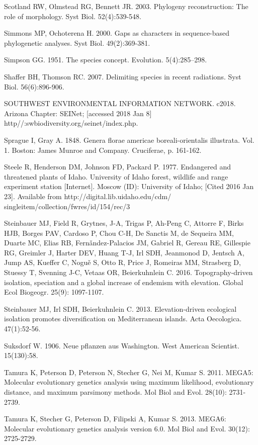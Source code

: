 Scotland RW, Olmstead RG, Bennett JR. 2003. Phylogeny reconstruction: The role of morphology. Syst Biol. 52(4):539-548.

Simmons MP, Ochoterena H. 2000. Gaps as characters in sequence-based phylogenetic analyses. Syst Biol. 49(2):369-381.

Simpson GG. 1951. The species concept. Evolution. 5(4):285–298.

Shaffer BH, Thomson RC. 2007. Delimiting species in recent radiations. Syst Biol. 56(6):896-906.

SOUTHWEST ENVIRONMENTAL INFORMATION NETWORK. c2018. Arizona Chapter: SEINet; [accessed 2018 Jan 8] http//:swbiodiversity.org/seinet/index.php.

Sprague I, Gray A. 1848. Genera florae americae boreali-orientalis illustrata.  Vol. 1. Boston: James Munroe and Company. Cruciferae, p. 161-162.

Steele R, Henderson DM, Johnson FD, Packard P. 1977. Endangered and threatened plants of Idaho. University of Idaho forest, wildlife and range experiment station [Internet]. Moscow (ID): University of Idaho; [Cited 2016 Jan 23]. Available from http://digital.lib.uidaho.edu/cdm/ singleitem/collection/fwres/id/154/rec/3

Steinbauer MJ, Field R, Grytnes, J-A, Trigas P, Ah-Peng C, Attorre F, Birks HJB, Borges PAV, Cardoso P, Chou C-H, De Sanctis M, de Sequeira MM,  Duarte MC, Elias RB, Fern\v{a}ndez-Palacios JM, Gabriel R, Gereau RE, Gillespie RG, Greimler J, Harter DEV, Huang T-J, Irl SDH, Jeanmonod D, Jentsch A, Jump AS, Kueffer C, Nogu\v{e} S, Otto R, Price J, Romeiras MM, Strasberg D, Stuessy T, Svenning J-C, Vetaas OR, Beierkuhnlein C. 2016. Topography-driven isolation, speciation and a global increase of endemism with elevation. Global Ecol Biogeogr. 25(9): 1097-1107.

Steinbauer MJ, Irl SDH, Beierkuhnlein C. 2013. Elevation-driven ecological isolation promotes diversification on Mediterranean islands. Acta Oecologica. 47(1):52-56.

Suksdorf W. 1906. Neue pflanzen aus Washington. West American Scientist. 15(130):58.

Tamura K, Peterson D, Peterson N, Stecher G, Nei M, Kumar S. 2011. MEGA5: Molecular evolutionary genetics analysis using maximum likelihood, evolutionary distance, and maximum parsimony methods. Mol Biol and Evol. 28(10): 2731-2739.

Tamura K, Stecher G, Peterson D, Filipski A, Kumar S. 2013. MEGA6: Molecular evolutionary genetics analysis version 6.0. Mol Biol and Evol. 30(12): 2725-2729.

